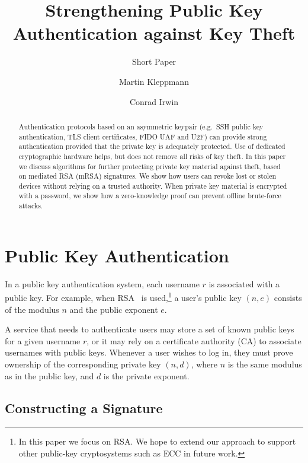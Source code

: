 \documentclass{llncs}
\begin{document}
\title{Strengthening Public Key Authentication against Key Theft}
\subtitle{Short Paper}
\author{Martin Kleppmann \and Conrad Irwin}
\maketitle

\begin{abstract}
Authentication protocols based on an asymmetric keypair (e.g.\ SSH public key authentication, TLS
client certificates, FIDO UAF and U2F) can provide strong authentication provided that the private
key is adequately protected. Use of dedicated cryptographic hardware helps, but does not remove all
risks of key theft. In this paper we discuss algorithms for further protecting private key material
against theft, based on mediated RSA (mRSA) signatures. We show how users can revoke lost or stolen
devices without relying on a trusted authority. When private key material is encrypted with a
password, we show how a zero-knowledge proof can prevent offline brute-force attacks.
\end{abstract}

\section{Public Key Authentication}\label{sec:intro}

In a public key authentication system, each username $r$ is associated with a public key. For
example, when RSA~\cite{RSA} is used,\footnote{In this paper we focus on RSA. We hope to extend our
approach to support other public-key cryptosystems such as ECC in future work.} a user's public key
$(n, e)$ consists of the modulus $n$ and the public exponent $e$.

A service that needs to authenticate users may store a set of known public keys for a given username
$r$, or it may rely on a certificate authority (CA) to associate usernames with public keys.
Whenever a user wishes to log in, they must prove ownership of the corresponding private key
$(n, d)$, where $n$ is the same modulus as in the public key, and $d$ is the private exponent.

\subsection{Constructing a Signature}\label{sec:signature}
\end{document}
